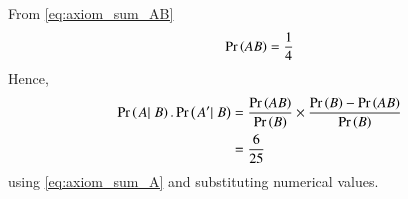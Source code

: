 From \eqref{eq:axiom_sum_AB}
\begin{align}
\Pr\left(AB\right) = \frac{1}{4}
\end{align}
Hence,  
\begin{align}
\Pr\left(\left.{A}|\right.{B}\right).\Pr\left(\left.{A^\prime} |\right.{B}\right) &= \frac{\Pr\left(AB\right)}{\Pr\left(B\right)} \times \frac{\Pr\left(B\right)-\Pr\left(AB\right)}{\Pr\left(B\right)}\\
&= \frac{6}{25}
\end{align}
using 
\eqref{eq:axiom_sum_A}
and substituting numerical values.



